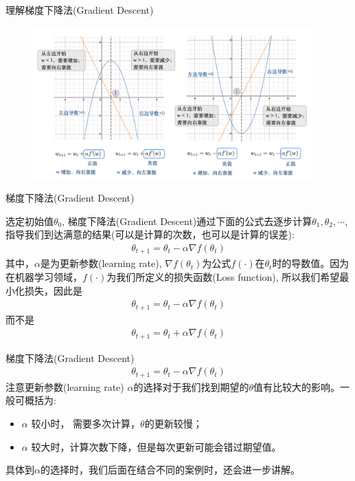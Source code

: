 \documentclass[handout]{ctexbeamer}
\begin{document}
\begin{frame}{理解梯度下降法(Gradient Descent)}
\begin{figure}[H]
	\centering
	\includegraphics[width=0.96\textwidth]{fig/C2C2GradientDes}
\end{figure}	
\end{frame}

\begin{frame}{梯度下降法(Gradient Descent)}
\begin{definition}
	选定初始值$\theta_0$, 梯度下降法(Gradient Descent)通过下面的公式去逐步计算$\theta_1, \theta_2, \cdots$,指导我们到达满意的结果(可以是计算的次数，也可以是计算的误差):
	\begin{align*}
		\theta_{t+1} = \theta_t - \alpha \nabla f(\theta_t)
	\end{align*}
	其中，$\alpha$是为更新参数(learning rate), $\nabla f(\theta_t)$为公式$f(\cdot)$在$\theta_t$时的导数值。因为在机器学习领域，$f(\cdot)$为我们所定义的损失函数(Loss function), 所以我们希望最小化损失，因此是
	\begin{align*}
		\theta_{t+1} = \theta_t - \alpha \nabla f(\theta_t)
	\end{align*}
	而不是
	\begin{align*}
		\theta_{t+1} = \theta_t + \alpha \nabla f(\theta_t)
	\end{align*}
\end{definition}
\end{frame}


\begin{frame}{梯度下降法(Gradient Descent)}
\begin{align*}
		\theta_{t+1} = \theta_t - \alpha \nabla f(\theta_t)
	\end{align*}
注意更新参数(learning rate) $\alpha$的选择对于我们找到期望的$\theta$值有比较大的影响。一般可概括为:
\begin{itemize}
	\item $\alpha$ 较小时， 需要多次计算，$\theta$的更新较慢；
	\item $\alpha$ 较大时，计算次数下降，但是每次更新可能会错过期望值。
\end{itemize}
具体到$\alpha$的选择时，我们后面在结合不同的案例时，还会进一步讲解。	
\end{frame}
\end{document}

